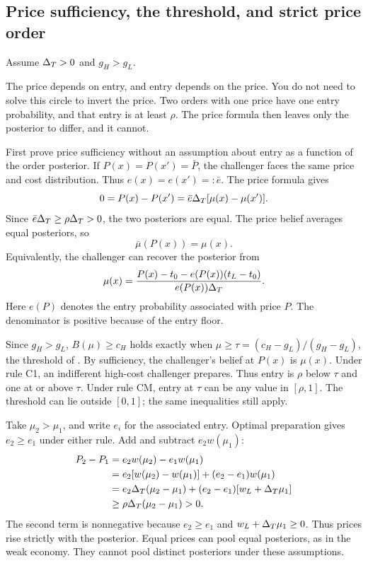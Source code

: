 \subsection{Price sufficiency, the threshold, and strict price order}
\label{sec:04_slot_beliefs-sufficiency}

Assume $\Delta_T>0$ and $g_H>g_L$.

\begin{intuition}
The price depends on entry, and entry depends on the price.
You do not need to solve this circle to invert the price.
Two orders with one price have one entry probability, and that entry is at least $\rho$.
The price formula then leaves only the posterior to differ, and it cannot.
\end{intuition}

First prove price sufficiency without an assumption about entry as a function of the order posterior.
If $P(x)=P(x')=\bar P$, the challenger faces the same price and cost distribution.
Thus $e(x)=e(x')=:\bar e$.
The price formula gives
\[
0=P(x)-P(x')=\bar e\Delta_T[\mu(x)-\mu(x')].
\]
Since $\bar e\Delta_T\ge\rho\Delta_T>0$, the two posteriors are equal.
The price belief averages equal posteriors, so
\[
\bar\mu(P(x))=\mu(x).
\]
Equivalently, the challenger can recover the posterior from
\[
\mu(x)=\frac{P(x)-t_0-e(P(x))(t_L-t_0)}{e(P(x))\Delta_T}.
\]
Here $e(P)$ denotes the entry probability associated with price $P$. 
The denominator is positive because of the entry floor.

Since $g_H>g_L$, $B(\mu)\ge c_H$ holds exactly when $\mu\ge\tau=(c_H-g_L)/(g_H-g_L)$, the threshold of .
By sufficiency, the challenger's belief at $P(x)$ is $\mu(x)$.
Under rule C1, an indifferent high-cost challenger prepares.
Thus entry is $\rho$ below $\tau$ and one at or above $\tau$.
Under rule CM, entry at $\tau$ can be any value in $[\rho,1]$.
The threshold can lie outside $[0,1]$; the same inequalities still apply.

Take $\mu_2>\mu_1$, and write $e_i$ for the associated entry.
Optimal preparation gives $e_2\ge e_1$ under either rule.
Add and subtract $e_2w(\mu_1)$:
\begin{align*}
P_2-P_1
&=e_2w(\mu_2)-e_1w(\mu_1)\\
&=e_2[w(\mu_2)-w(\mu_1)]+(e_2-e_1)w(\mu_1)\\
&=e_2\Delta_T(\mu_2-\mu_1)+(e_2-e_1)[w_L+\Delta_T\mu_1]\\
&\ge\rho\Delta_T(\mu_2-\mu_1)>0.
\end{align*}
The second term is nonnegative because $e_2\ge e_1$ and $w_L+\Delta_T\mu_1\ge0$.
Thus prices rise strictly with the posterior. 
Equal prices can pool equal posteriors, as in the weak economy.
They cannot pool distinct posteriors under these assumptions.


